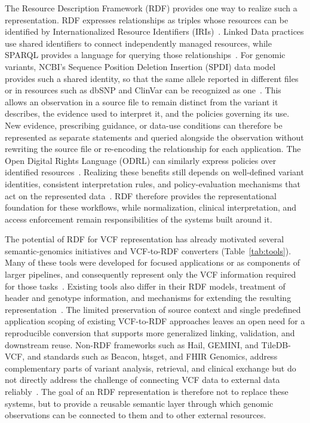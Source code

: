 \documentclass[pdflatex,sn-mathphys-num]{sn-jnl}
\begin{document}
The Resource Description Framework (RDF) provides one way to realize such a representation.
RDF expresses relationships as triples whose resources can be identified by Internationalized Resource Identifiers (IRIs)~\cite{rdf,hogan_knowledge_graphs_2021}.
Linked Data practices use shared identifiers to connect independently managed resources, while SPARQL provides a language for querying those relationships~\cite{W3CLinkedDataWiki,bio2rdf_2008,openbiolink_2019,sib_2024,sparqllang}.
For genomic variants, NCBI's Sequence Position Deletion Insertion (SPDI) data model provides such a shared identity, so that the same allele reported in different files or in resources such as dbSNP and ClinVar can be recognized as one~\cite{holmes2020spdi}.
This allows an observation in a source file to remain distinct from the variant it describes, the evidence used to interpret it, and the policies governing its use.
New evidence, prescribing guidance, or data-use conditions can therefore be represented as separate statements and queried alongside the observation without rewriting the source file or re-encoding the relationship for each application.
The Open Digital Rights Language (ODRL) can similarly express policies over identified resources~\cite{odrl_2018}.
Realizing these benefits still depends on well-defined variant identities, consistent interpretation rules, and policy-evaluation mechanisms that act on the represented data~\cite{odrl_2018,xacml3_2013}.
RDF therefore provides the representational foundation for these workflows, while normalization, clinical interpretation, and access enforcement remain responsibilities of the systems built around it.

The potential of RDF for VCF representation has already motivated several semantic-genomics initiatives and VCF-to-RDF converters (Table~\ref{tab:tools}).
Many of these tools were developed for focused applications or as components of larger pipelines, and consequently represent only the VCF information required for those tasks~\cite{katayama2019biohackathon,JVarkit_2015,bio_vcf,togovar_2022,semantic_beac_2025}.
Existing tools also differ in their RDF models, treatment of header and genotype information, and mechanisms for extending the resulting representation~\cite{togovar_2022,JVarkit_2015,sparqling_genomics_2020,sparqling_genomics_software,baran2015gfvo}.
The limited preservation of source context and single predefined application scoping of existing VCF-to-RDF approaches leaves an open need for a reproducible conversion that supports more generalized linking, validation, and downstream reuse.
Non-RDF frameworks such as Hail, GEMINI, and TileDB-VCF, and standards such as Beacon, htsget, and FHIR Genomics, address complementary parts of variant analysis, retrieval, and clinical exchange but do not directly address the challenge of connecting VCF data to external data reliably~\cite{hail_software,paila2013gemini,tiledb_vcf_software,rambla2022beacon,kelleher2019htsget,fhir_genomics_ig}.
The goal of an RDF representation is therefore not to replace these systems, but to provide a reusable semantic layer through which genomic observations can be connected to them and to other external resources.
\end{document}
